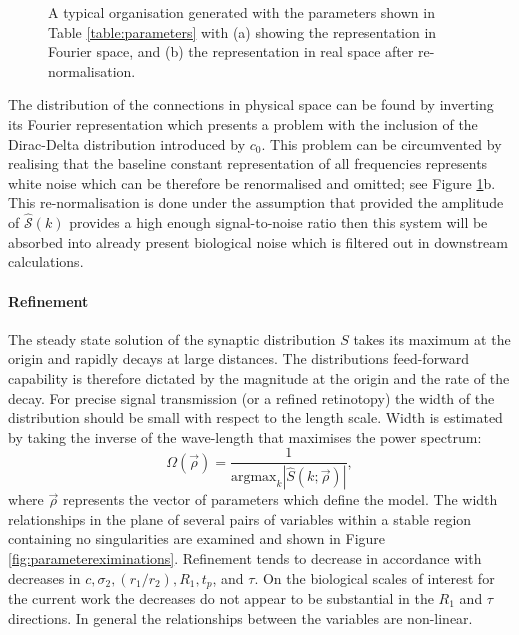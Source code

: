 \begin{figure}
\begin{subfigure}{0.4\textwidth}
		\caption{}
	\end{subfigure}
	\def\c{A typical organisation generated with the parameters shown in Table \ref{table:parameters} with (a) showing the representation in Fourier space, and (b) the representation in real space after re-normalisation. }
	\caption[\c]{\label{fig:powerdistribution} \c} 
\end{figure}

The distribution of the connections in physical space can be found by inverting its Fourier representation which presents a problem with the inclusion of the Dirac-Delta distribution introduced by $c_0$. This problem can be circumvented by realising that the baseline constant representation of all frequencies represents white noise which can be therefore be renormalised and omitted; see Figure \ref{fig:powerdistribution}b. This re-normalisation is done under the assumption that provided the amplitude of $\hat{\mathcal{S}}(k)$ provides a high enough signal-to-noise ratio then this system will be absorbed into already present biological noise which is filtered out in downstream calculations.
\paragraph{Refinement}
The steady state solution of the synaptic distribution $S$ takes its maximum at the origin and rapidly decays at large distances. The distributions feed-forward capability is therefore dictated by the magnitude at the origin and the rate of the decay. For precise signal transmission (or a refined retinotopy) the width of the distribution should be small with respect to the length scale. Width is estimated by taking the inverse of the wave-length that maximises the power spectrum:
\begin{equation} \label{eq:width}
	\Omega(\vec{\rho}) =  \frac{1}{\text{argmax}_k\left| \hat{S}(k;\vec{\rho})\right|},
\end{equation}
where $\vec{\rho}$ represents the vector of parameters which define the model. The width relationships in the plane of several pairs of variables within a stable region containing no singularities are examined and shown in Figure \ref{fig:parametereximinations}. Refinement tends to decrease in accordance with decreases in $c, \sigma_2, (r_1/r_2), R_1, t_p$, and $\tau$. On the biological scales of interest for the current work the decreases do not appear to be substantial in the $R_1$ and $\tau$ directions. In general the relationships between the variables are non-linear.

